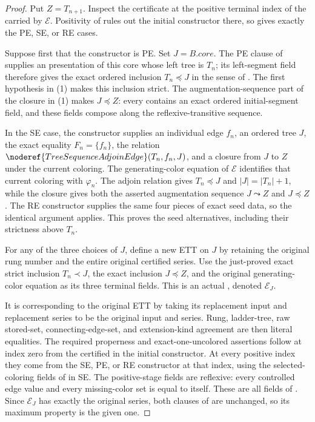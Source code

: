 \begin{proof}
Put $Z=T_{n+1}$.  Inspect the certificate at the positive terminal index
of the  carried by $\mathcal E$.  Positivity of
 rules out the initial constructor there,
so  gives exactly the PE, SE, or RE cases.

Suppose first that the constructor is PE.  Set $J=B.\mathit{core}$.
The PE clause of  supplies an
 presentation of this core whose left tree is
$T_n$; its left-segment field therefore gives the exact ordered inclusion
$T_n\preccurlyeq J$ in the sense of
.  The first hypothesis in (1) makes this inclusion
strict.  The augmentation-sequence part of the closure in (1) makes
$J\preccurlyeq Z$: every  contains an
exact ordered initial-segment field, and these fields compose along the
reflexive-transitive sequence.

In the SE case, the constructor supplies an individual edge $f_n$, an
ordered tree $J$, the exact equality $F_n=\{f_n\}$, the relation
$\noderef{TreeSequenceAdjoinEdge}(T_n,f_n,J)$, and a closure from $J$ to
$Z$ under the current coloring.  The generating-color equation of
$\mathcal E$ identifies that current coloring with $\varphi_n$.  The
adjoin relation gives $T_n\preccurlyeq J$ and
$|J|=|T_n|+1$, while the closure gives both the asserted augmentation
sequence $J\leadsto Z$ and $J\preccurlyeq Z$.  The RE constructor supplies
the same four pieces of exact seed data, so the identical argument applies.
This proves the seed alternatives, including their strictness above
$T_n$.

For any of the three choices of $J$, define a new ETT on $J$ by retaining
the original rung number and the entire original certified series.  Use
the just-proved exact strict inclusion $T_n\prec J$, the exact inclusion
$J\preccurlyeq Z$, and the original generating-color equation as its
three terminal fields.  This is an actual
, denoted $\mathcal E_J$.

It is corresponding to the original ETT by taking its replacement input
and replacement series to be the original input and series.  Rung,
ladder-tree, raw stored-set, connecting-edge-set, and extension-kind
agreement are then literal equalities.  The required properness and
exact-one-uncolored assertions follow at index zero from the certified
 in the initial constructor.  At every positive index
they come from the SE, PE, or RE constructor at that index, using the
selected-coloring fields of  in SE.  The positive-stage
 fields are reflexive: every controlled edge value
and every missing-color set is equal to itself.  These are all fields of
.  Since
$\mathcal E_J$ has exactly the original series, both clauses of
 are unchanged, so its maximum property is the
given one.


\end{proof}

